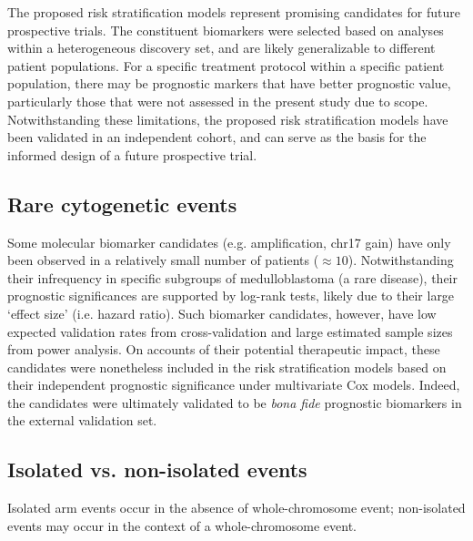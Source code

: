 The proposed risk stratification models represent promising candidates for future prospective trials. The constituent biomarkers were selected based on analyses within a heterogeneous discovery set, and are likely generalizable to different patient populations. For a specific treatment protocol within a specific patient population, there may be prognostic markers that have better prognostic value, particularly those that were not assessed in the present study due to scope. Notwithstanding these limitations, the proposed risk stratification models have been validated in an independent cohort, and can serve as the basis for the informed design of a future prospective trial.

\subsection{Rare cytogenetic events}

Some molecular biomarker candidates (e.g.  amplification, chr17 gain) have only been observed in a relatively small number of patients ($\approx 10$). Notwithstanding their infrequency in specific subgroups of medulloblastoma (a rare disease), their prognostic significances are supported by log-rank tests, likely due to their large `effect size' (i.e. hazard ratio). Such biomarker candidates, however, have low expected validation rates from cross-validation and large estimated sample sizes from power analysis. On accounts of their potential therapeutic impact, these candidates were nonetheless included in the risk stratification models based on their independent prognostic significance under multivariate Cox models. Indeed, the candidates were ultimately validated to be \emph{bona fide} prognostic biomarkers in the external validation set.

\subsection{Isolated vs. non-isolated events}

Isolated arm events occur in the absence of whole-chromosome event; non-isolated events may occur in the context of a whole-chromosome event.



